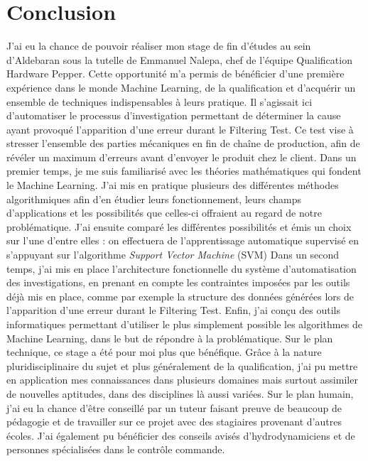 \chapter{Conclusion}
\label{Conclusion}
\thispagestyle{fancy}

J'ai eu la chance de pouvoir réaliser mon stage de fin d'études au sein d'Aldebaran sous la tutelle de Emmanuel Nalepa, chef de l'équipe Qualification Hardware Pepper. Cette opportunité m'a permis de bénéficier d'une première expérience dans le monde Machine Learning, de la qualification et d'acquérir un ensemble de techniques indispensables à leurs pratique. Il s'agissait ici d'automatiser le processus d'investigation permettant de déterminer la cause ayant provoqué l'apparition d'une erreur durant le Filtering Test. Ce test vise à stresser l'ensemble des parties mécaniques en fin de chaîne de production, afin de révéler un maximum d'erreurs avant d'envoyer le produit chez le client.
\newline
\newline
Dans un premier temps, je me suis familiarisé avec les théories mathématiques qui fondent le Machine Learning. J'ai mis en pratique plusieurs des différentes méthodes algorithmiques afin d'en étudier leurs fonctionnement, leurs champs d'applications et les possibilités que celles-ci offraient au regard de notre problématique. J'ai ensuite comparé les différentes possibilités et émis un choix sur l'une d'entre elles : on effectuera de l'apprentissage automatique supervisé en s'appuyant sur l'algorithme \emph{Support Vector Machine} (SVM)
\newline
Dans un second temps, j'ai mis en place l'architecture fonctionnelle du système d'automatisation des investigations, en prenant en compte les contraintes imposées par les outils déjà mis en place, comme par exemple la structure des données générées lors de l'apparition d'une erreur durant le Filtering Test. 
\newline
Enfin, j'ai conçu des outils informatiques permettant d'utiliser le plus simplement possible les algorithmes de Machine Learning, dans le but de répondre à la problématique. 
\newline
\newline
Sur le plan technique, ce stage a été pour moi plus que bénéfique. Grâce à la nature pluridisciplinaire du sujet et plus généralement de la qualification, j'ai pu mettre en application mes connaissances dans plusieurs domaines mais surtout assimiler de nouvelles aptitudes, dans des disciplines là aussi variées. Sur le plan humain, j'ai eu la chance d’être conseillé par un tuteur faisant preuve de beaucoup de pédagogie et de travailler sur ce projet avec des stagiaires provenant d'autres écoles. J'ai également pu bénéficier des conseils avisés d'hydrodynamiciens et de personnes spécialisées dans le contrôle commande.